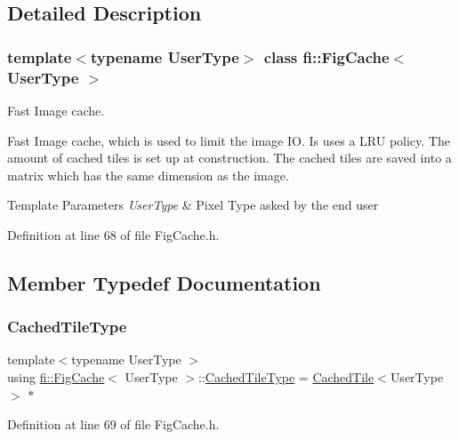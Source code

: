 \subsection{Detailed Description}
\subsubsection*{template$<$typename User\+Type$>$\newline
class fi\+::\+Fig\+Cache$<$ User\+Type $>$}

Fast Image cache. 

Fast Image cache, which is used to limit the image IO. Is uses a L\+RU policy. The amount of cached tiles is set up at construction. The cached tiles are saved into a matrix which has the same dimension as the image.


\begin{DoxyTemplParams}{Template Parameters}
{\em User\+Type} & Pixel Type asked by the end user \\
\hline
\end{DoxyTemplParams}


Definition at line 68 of file Fig\+Cache.\+h.



\subsection{Member Typedef Documentation}
\mbox{\label{classfi_1_1FigCache_a7b9bbc4a832c01c3a461f573445c3c41}} 
\subsubsection{\texorpdfstring{Cached\+Tile\+Type}{CachedTileType}}
{\footnotesize\ttfamily template$<$typename User\+Type $>$ \\
using \hyperlink{classfi_1_1FigCache}{fi\+::\+Fig\+Cache}$<$ User\+Type $>$\+::\hyperlink{classfi_1_1FigCache_a7b9bbc4a832c01c3a461f573445c3c41}{Cached\+Tile\+Type} =  \hyperlink{classfi_1_1CachedTile}{Cached\+Tile}$<$User\+Type$>$ $\ast$\hspace{0.3cm}{\ttfamily [private]}}



Definition at line 69 of file Fig\+Cache.\+h.



